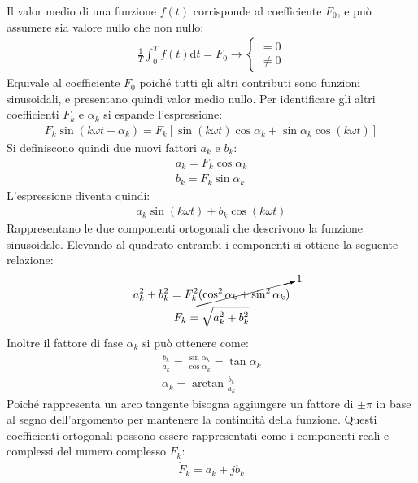 \documentclass{article}
\newcommand{\df}{\mathrm{d}}
\numberwithin{equation}{subsection}
\begin{document}
Il valor medio di una funzione $f(t)$ corrisponde al coefficiente $F_0$, e può assumere sia valore nullo che non nullo:
\begin{gather*}
    \displaystyle\frac{1}{T}\int_{0}^Tf(t)\df t=F_0\to\begin{cases}
        =0\\
        \neq0
    \end{cases}
\end{gather*}
Equivale al coefficiente $F_0$ poiché tutti gli altri contributi sono funzioni sinusoidali, e presentano quindi valor medio nullo. 
Per identificare gli altri coefficienti $F_k$ e $\alpha_k$ si espande l'espressione:
\begin{gather*}
    F_k\sin(k\omega t+\alpha_k)=F_k\left[\sin(k\omega t)\cos\alpha_k+\sin\alpha_k\cos(k\omega t)\right]
\end{gather*}
Si definiscono quindi due nuovi fattori $a_k$ e $b_k$:
\begin{gather*}
    a_k=F_k\cos\alpha_k\\
    b_k=F_k\sin\alpha_k
\end{gather*}
L'espressione diventa quindi:
\begin{gather*}
    a_k\sin(k\omega t)+b_k\cos(k\omega t)
\end{gather*}
Rappresentano le due componenti ortogonali che descrivono la funzione sinusoidale. Elevando al quadrato entrambi i componenti si ottiene la seguente relazione:
\begin{gather*}
    a_k^2+b_k^2=F_k^2\cancelto{1}{(\cos^2\alpha_k+\sin^2\alpha_k)}\\
    F_k=\sqrt{a_k^2+b_k^2}
\end{gather*}
Inoltre il fattore di fase $\alpha_k$ si può ottenere come:
\begin{gather*}
    \displaystyle\frac{b_k}{a_k}=\frac{\sin\alpha_k}{\cos\alpha_k}=\tan\alpha_k\\
    \alpha_k=\arctan\displaystyle\frac{b_k}{a_k}
\end{gather*}
Poiché rappresenta un arco tangente bisogna aggiungere un fattore di $\pm\pi$ in base al segno dell'argomento per mantenere la continuità della funzione. 
Questi coefficienti ortogonali possono essere rappresentati come i componenti reali e complessi del numero complesso $F_k$:
\begin{gather*}
    \dot F_k=a_k+jb_k
\end{gather*}
\end{document}
